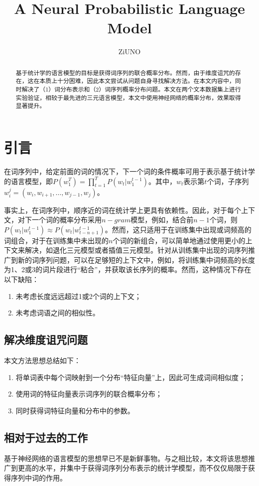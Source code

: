 \documentclass[UTF8]{ctexart}
\title{A Neural Probabilistic Language Model}
\author{ZiUNO}
\date{}
\begin{document}
\maketitle
\begin{abstract}
基于统计学的语言模型的目标是获得词序列的联合概率分布。然而，由于维度诅咒的存在，这在本质上十分困难，因此本文尝试从问题自身寻找解决方法。在本文内容中，同时解决了（1）词分布表示和（2）词序列概率分布问题。本文在两个文本数据集上进行实验验证，相较于最先进的三元语言模型，本文中使用神经网络的概率分布，效果取得显著提升。
\end{abstract}
\section{引言}
\par{在词序列中，给定前面的词的情况下，下一个词的条件概率可用于表示基于统计学的语言模型，即$P(w_{1}^T)=\prod_{t=1}^TP(w_{t}|w_{1}^{t-1})$。其中，$w_{t}$表示第$t$个词，子序列$w_{i}^j=(w_{i},w_{i+1},\dots,w_{j-1},w_{j})$。}
\par{事实上，在词序列中，顺序近的词在统计学上更具有依赖性。因此，对于每个上下文，对下一个词的概率分布采用$n-gram$模型，例如，结合前$n-1$个词，则$P(w_{t}|w_{1}^{t-1})\approx P(w_{t}|w_{t-n+1}^{t-1})$。然而，这只适用于在训练集中出现或词频高的词组合，对于在训练集中未出现的$n$个词的新组合，可以简单地通过使用更小的上下文来解决，如退化三元模型或者插值三元模型。针对从训练集中出现的词序列推广到新的词序列问题，可以在足够短的上下文中，例如，将训练集中词频高的长度为1、2或3的词片段进行“粘合”，并获取该长序列的概率。然而，这种情况下存在以下缺陷：}
\begin{enumerate}
  \item 未考虑长度远远超过1或2个词的上下文；
  \item 未考虑词语之间的相似性。
\end{enumerate}
\subsection{解决维度诅咒问题}
本文方法思想总结如下：
\begin{enumerate}
  \item 将单词表中每个词映射到一个分布“特征向量”上，因此可生成词间相似度；
  \item 使用词的特征向量表示词序列的联合概率分布；
  \item 同时获得词特征向量和分布中的参数。
\end{enumerate}
\subsection{相对于过去的工作}
\par{基于神经网络的语言模型的思想早已不是新鲜事物。与之相比较，本文将该思想推广到更高的水平，并集中于获得词序列分布表示的统计学模型，而不仅仅局限于获得序列中词的作用。}
\end{document}
